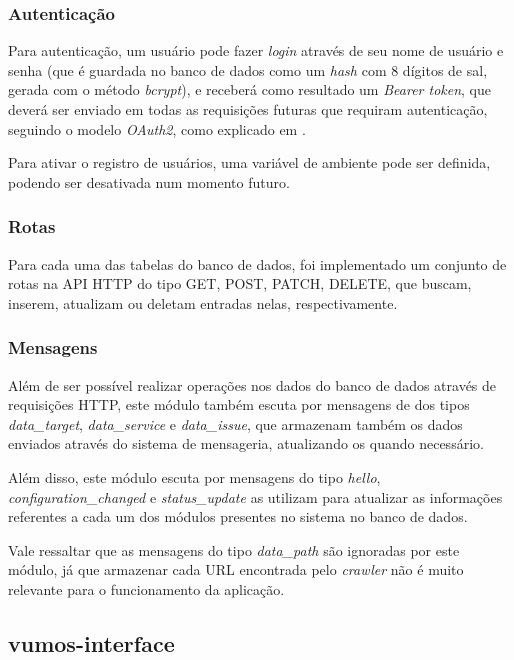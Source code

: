    \subsubsection{Autenticação}
    
    Para autenticação, um usuário pode fazer \textit{login} através de seu nome de usuário e senha (que é guardada no banco de dados como um \textit{hash} com 8 dígitos de sal, gerada com o método \textit{bcrypt}), e receberá como resultado um \textit{Bearer token}, que deverá ser enviado em todas as requisições futuras que requiram autenticação, seguindo o modelo \textit{OAuth2}, como explicado em \cite{jones2012oauth}.
    
    Para ativar o registro de usuários, uma variável de ambiente pode ser definida, podendo ser desativada num momento futuro.
    
    
    \subsubsection{Rotas}
    
    Para cada uma das tabelas do banco de dados, foi implementado um conjunto de rotas na API HTTP do tipo GET, POST, PATCH, DELETE, que buscam, inserem, atualizam ou deletam entradas nelas, respectivamente.
    
    \subsubsection{Mensagens}
    
    Além de ser possível realizar operações nos dados do banco de dados através de requisições HTTP, este módulo também escuta por mensagens de dos tipos \textit{data\_target}, \textit{data\_service} e \textit{data\_issue}, que armazenam também os dados enviados através do sistema de mensageria, atualizando os quando necessário.
    
    Além disso, este módulo escuta por mensagens do tipo \textit{hello}, \textit{configuration\_changed} e \textit{status\_update} as utilizam para atualizar as informações referentes a cada um dos módulos presentes no sistema no banco de dados.
    
    Vale ressaltar que as mensagens do tipo \textit{data\_path} são ignoradas por este módulo, já que armazenar cada URL encontrada pelo \textit{crawler} não é muito relevante para o funcionamento da aplicação.
    

    \subsection{vumos-interface}
    
